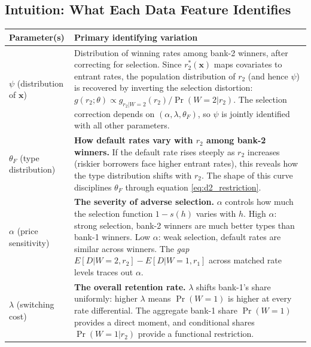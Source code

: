 \documentclass[12pt]{article}
\theoremstyle{plain}
\theoremstyle{plain}
\theoremstyle{definition}  %
\theoremstyle{remark}  %
\begin{document}
\subsection{Intuition: What Each Data Feature Identifies}\label{sec:intuition}

\begin{center}
\renewcommand{\arraystretch}{1.5}
\begin{tabular}{p{3.5cm}p{9.5cm}}
\toprule
\textbf{Parameter(s)} & \textbf{Primary identifying variation} \\
\midrule
$\psi$ \newline (distribution of $\mathbf{x}$) & Distribution of winning rates among bank-2 winners, after correcting for selection.  Since $r_2^*(\mathbf{x})$ maps covariates to entrant rates, the population distribution of $r_2$ (and hence $\psi$) is recovered by inverting the selection distortion: $g(r_2;\theta) \propto g_{r_2|W=2}(r_2)/\Pr(W\!=\!2|r_2)$.  The selection correction depends on $(\alpha, \lambda, \theta_F)$, so $\psi$ is jointly identified with all other parameters. \\[4pt]
$\theta_F$ \newline (type distribution) & \textbf{How default rates vary with $r_2$ among bank-2 winners.}  If the default rate rises steeply as $r_2$ increases (riskier borrowers face higher entrant rates), this reveals how the type distribution shifts with $r_2$.  The shape of this curve disciplines $\theta_F$ through equation \eqref{eq:d2_restriction}. \\[4pt]
$\alpha$ \newline (price sensitivity) & \textbf{The severity of adverse selection.} $\alpha$ controls how much the selection function $1-s(h)$ varies with $h$.  High $\alpha$: strong selection, bank-2 winners are much better types than bank-1 winners.  Low $\alpha$: weak selection, default rates are similar across winners.  The \emph{gap} $E[D|W\!=\!2, r_2] - E[D|W\!=\!1, r_1]$ across matched rate levels traces out $\alpha$. \\[4pt]
$\lambda$ \newline (switching cost) & \textbf{The overall retention rate.}  $\lambda$ shifts bank-1's share uniformly: higher $\lambda$ means $\Pr(W\!=\!1)$ is higher at every rate differential.  The aggregate bank-1 share $\Pr(W\!=\!1)$ provides a direct moment, and conditional shares $\Pr(W\!=\!1|r_2)$ provide a functional restriction. \\
\bottomrule
\end{tabular}
\end{center}
\end{document}
